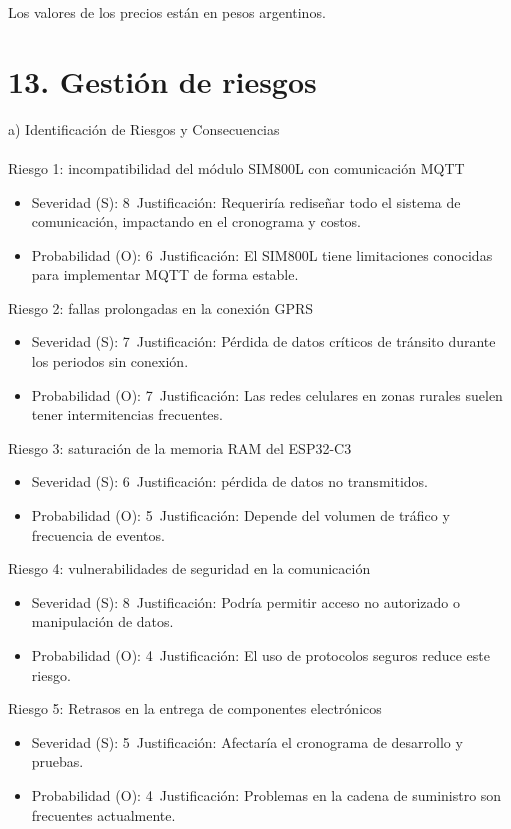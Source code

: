\documentclass[
11pt, %
]{charter}
\begin{document}
Los valores de los precios están en pesos argentinos.

\section{13. Gestión de riesgos}

\label{sec:riesgos}

a) Identificación de Riesgos y Consecuencias  \\
\\
Riesgo 1: incompatibilidad del módulo SIM800L con comunicación MQTT
\begin{itemize}
\item Severidad (S): 8\
Justificación: Requeriría rediseñar todo el sistema de comunicación, impactando en el cronograma y costos.
\item Probabilidad (O): 6\
Justificación: El SIM800L tiene limitaciones conocidas para implementar MQTT de forma estable.
\end{itemize}

Riesgo 2: fallas prolongadas en la conexión GPRS
\begin{itemize}
\item Severidad (S): 7\
Justificación: Pérdida de datos críticos de tránsito durante los periodos sin conexión.
\item Probabilidad (O): 7\
Justificación: Las redes celulares en zonas rurales suelen tener intermitencias frecuentes.
\end{itemize}

Riesgo 3: saturación de la memoria RAM del ESP32-C3
\begin{itemize}
\item Severidad (S): 6\
Justificación: pérdida de datos no transmitidos.
\item Probabilidad (O): 5\
Justificación: Depende del volumen de tráfico y frecuencia de eventos.
\end{itemize}

Riesgo 4: vulnerabilidades de seguridad en la comunicación
\begin{itemize}
\item Severidad (S): 8\
Justificación: Podría permitir acceso no autorizado o manipulación de datos.
\item Probabilidad (O): 4\
Justificación: El uso de protocolos seguros reduce este riesgo.
\end{itemize}

Riesgo 5: Retrasos en la entrega de componentes electrónicos
\begin{itemize}
\item Severidad (S): 5\
Justificación: Afectaría el cronograma de desarrollo y pruebas.
\item Probabilidad (O): 4\
Justificación: Problemas en la cadena de suministro son frecuentes actualmente.
\end{itemize}
\end{document}
